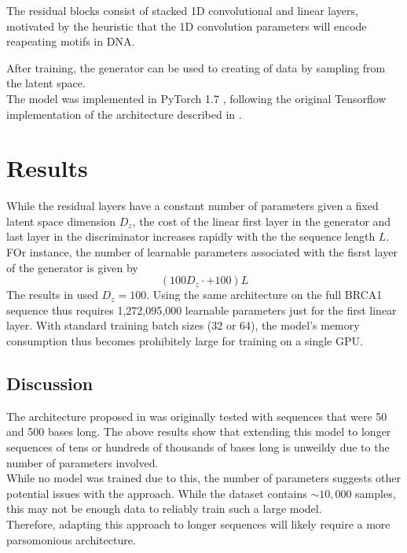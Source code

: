 \documentclass[11pt]{article}
\begin{document}
The residual blocks consist of stacked 1D convolutional and linear layers, motivated by the heuristic that the 1D convolution parameters will encode reapeating motifs in DNA.

After training, the generator can be used to creating of data by sampling from 
the latent space. \\

The model was implemented in PyTorch 1.7 \cite{paszke2019pytorch}, following the 
original Tensorflow implementation of the architecture described in 
\cite{killoran2017generating}.

\section{Results}


While the residual layers have a constant number of parameters given 
a fixed latent space dimension $D_z$, the cost of the linear first layer in the generator 
and last  layer in the discriminator increases rapidly with the the 
sequence length $L$. FOr instance, the number of learnable parameters associated 
with the fisrst layer of the generator is given by
\[
    (100 D_z \cdot + 100)L   
\] 
The results in \cite{killoran2017generating} used $D_z = 100$. Using the same 
architecture on the full BRCA1 sequence thus requires 1,272,095,000 learnable 
parameters just for the first linear layer. With standard training batch sizes (32 or 64),
the model's memory consumption thus becomes prohibitely large for training on a single
GPU.

\subsection{Discussion}

The architecture proposed in \cite{killoran2017generating} was originally tested with 
sequences that were 50 and 500 bases long. The above results show that extending 
this model to longer sequences of tens or hundreds of thousands of bases long is unweildy
due to the number of parameters involved. \\
While no model was trained due to this, the number of parameters suggests other 
potential issues with the approach. While the dataset contains $\sim 10,000$ samples, 
this may not be enough data to reliably train such a large model. \\
Therefore, adapting this approach to longer sequences will likely require a more parsomonious architecture. 
\end{document}
